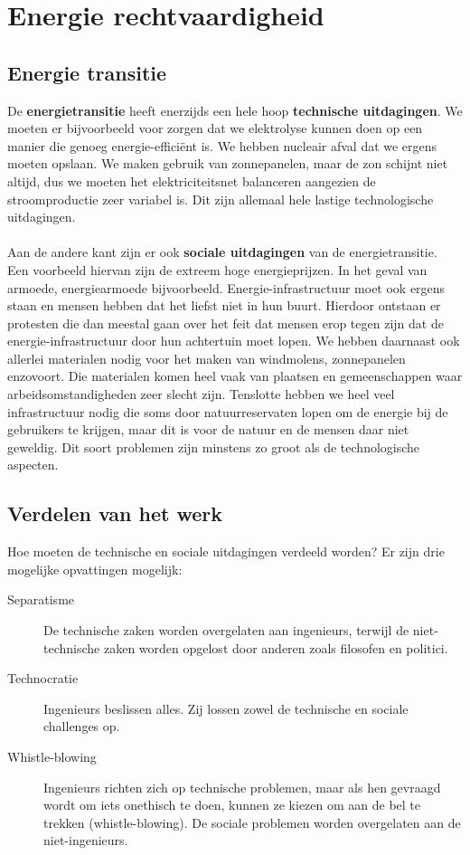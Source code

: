 \documentclass[../summary.tex]{subfiles}
\begin{document}
	
	\section{Energie rechtvaardigheid}
	\subsection{Energie transitie}
	
	De \textbf{energietransitie} heeft enerzijds een hele hoop \textbf{technische uitdagingen}. We moeten er bijvoorbeeld voor zorgen dat we elektrolyse kunnen doen op een manier die genoeg energie-efficiënt is. We hebben nucleair afval dat we ergens moeten opslaan. We maken gebruik van zonnepanelen, maar de zon schijnt niet altijd, dus we moeten het elektriciteitsnet balanceren aangezien de stroomproductie zeer variabel is. Dit zijn allemaal hele lastige technologische uitdagingen. \\
	\\
	Aan de andere kant zijn er ook \textbf{sociale uitdagingen} van de energietransitie. Een voorbeeld hiervan zijn de extreem hoge energieprijzen. In het geval van armoede, energiearmoede bijvoorbeeld. Energie-infrastructuur moet ook ergens staan en mensen hebben dat het liefst niet in hun buurt. Hierdoor ontstaan er protesten die dan meestal gaan over het feit dat mensen erop tegen zijn dat de energie-infrastructuur door hun achtertuin moet lopen. We hebben daarnaast ook allerlei materialen nodig voor het maken van windmolens, zonnepanelen enzovoort. Die materialen komen heel vaak van plaatsen en gemeenschappen waar arbeidsomstandigheden zeer slecht zijn. Tenslotte hebben we heel veel infrastructuur nodig die soms door natuurreservaten lopen om de energie bij de gebruikers te krijgen, maar dit is voor de natuur en de mensen daar niet geweldig. Dit soort problemen zijn minstens zo groot als de technologische aspecten. 
	
	\subsection{Verdelen van het werk}
	
	Hoe moeten de technische en sociale uitdagingen verdeeld worden?  Er zijn drie mogelijke opvattingen mogelijk:

	\begin{description}
		\item[Separatisme] De technische zaken worden overgelaten aan ingenieurs, terwijl de niet-technische zaken worden opgelost door anderen zoals filosofen en politici.
		\item [Technocratie] Ingenieurs beslissen alles. Zij lossen zowel de technische en sociale challenges op.
		\item [Whistle-blowing] Ingenieurs richten zich op technische problemen, maar als hen gevraagd wordt om iets onethisch te doen, kunnen ze kiezen om aan de bel te trekken (whistle-blowing). De sociale problemen worden overgelaten aan de niet-ingenieurs.
	\end{description}
	
\end{document}
